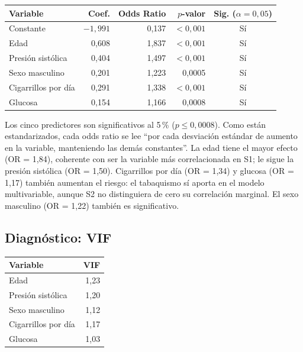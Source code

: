 \documentclass[11pt,a4paper]{article}
\begin{document}
\begin{center}
\small
\begin{tabular}{@{}lrrrc@{}}
\toprule
\textbf{Variable} & \textbf{Coef.} & \textbf{Odds Ratio} & \textbf{$p$-valor} & \textbf{Sig. ($\alpha=0,05$)} \\
\midrule
Constante            & $-1,991$ & 0,137 & $<0,001$ & Sí \\
Edad                  & 0,608    & 1,837 & $<0,001$ & Sí \\
Presión sistólica     & 0,404    & 1,497 & $<0,001$ & Sí \\
Sexo masculino        & 0,201    & 1,223 & 0,0005   & Sí \\
Cigarrillos por día   & 0,291    & 1,338 & $<0,001$ & Sí \\
Glucosa               & 0,154    & 1,166 & 0,0008   & Sí \\
\bottomrule
\end{tabular}
\end{center}

Los cinco predictores son significativos al 5\,\% ($p\leq0,0008$). Como están estandarizados, cada odds ratio se lee ``por cada desviación estándar de aumento en la variable, manteniendo las demás constantes''. La edad tiene el mayor efecto (OR = 1,84), coherente con ser la variable más correlacionada en S1; le sigue la presión sistólica (OR = 1,50). Cigarrillos por día (OR = 1,34) y glucosa (OR = 1,17) también aumentan el riesgo: el tabaquismo sí aporta en el modelo multivariable, aunque S2 no distinguiera de cero su correlación marginal. El sexo masculino (OR = 1,22) también es significativo.

\subsection{Diagnóstico: VIF}
\begin{center}
\small
\begin{tabular}{@{}lr@{}}
\toprule
\textbf{Variable} & \textbf{VIF} \\
\midrule
Edad                & 1,23 \\
Presión sistólica   & 1,20 \\
Sexo masculino      & 1,12 \\
Cigarrillos por día & 1,17 \\
Glucosa             & 1,03 \\
\bottomrule
\end{tabular}
\end{center}
\end{document}
